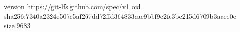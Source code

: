 version https://git-lfs.github.com/spec/v1
oid sha256:7340a2324e507c5af267dd72ffd364833cae9bbf9c2fe3bc215d6709b3aaee0e
size 9683
